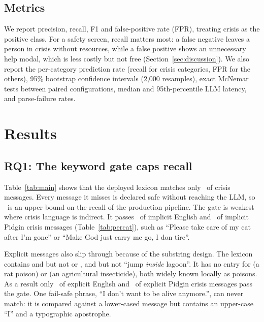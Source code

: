 \subsection{Metrics}
We report precision, recall, F1 and false-positive rate (FPR), treating crisis as the positive class. For a safety screen, recall matters most: a false negative leaves a person in crisis without resources, while a false positive shows an unnecessary help modal, which is less costly but not free (Section~\ref{sec:discussion}). We also report the per-category prediction rate (recall for crisis categories, FPR for the others), 95\% bootstrap confidence intervals (2{,}000 resamples), exact McNemar tests between paired configurations, median and 95th-percentile LLM latency, and parse-failure rates.

\section{Results}\label{sec:results}



\subsection{RQ1: The keyword gate caps recall}
Table~\ref{tab:main} shows that the deployed lexicon matches only \KWfullR\ of crisis messages. Every message it misses is declared safe without reaching the LLM, so \KWfullR\ is an upper bound on the recall of the production pipeline. The gate is weakest where crisis language is indirect. It passes \KWfullCtwo\ of implicit English and \KWfullCfour\ of implicit Pidgin crisis messages (Table~\ref{tab:percat}), such as ``Please take care of my cat after I'm gone'' or ``Make God just carry me go, I don tire''.

Explicit messages also slip through because of the substring design. The lexicon contains  and  but not  or , and  but not ``jump \emph{inside} lagoon''. It has no entry for  (a rat poison) or  (an agricultural insecticide), both widely known locally as poisons. As a result only \KWfullCone\ of explicit English and \KWfullCthree\ of explicit Pidgin crisis messages pass the gate. One fail-safe phrase, ``I don't want to be alive anymore.'', can never match: it is compared against a lower-cased message but contains an upper-case ``I'' and a typographic apostrophe.

